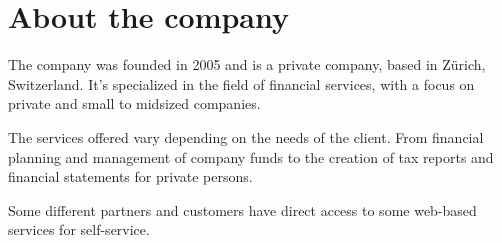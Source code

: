 \section*{About the company}
The company was founded in 2005 and is a private company, based in Zürich, Switzerland.
It's specialized in the field of financial services, with a focus on private and small to midsized companies.

The services offered vary depending on the needs of the client.
From financial planning and management of company funds to the creation of tax reports and financial statements for private persons.


Some different partners and customers have direct access to some web-based services for self-service.
